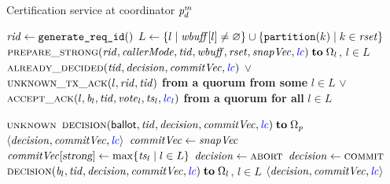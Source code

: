 
\begin{algorithm*}[t]
  \caption{Certification service at coordinator $\mathit{p}^{m}_{d}$}
  \label{alg:unistore-certify}
  \begin{algorithmic}[1]
    \Function{\certify}{$\callerMode, \tidvar, \wbuffvar, \rsetvar, \snapvc, \lccolor{\lcvar}$}
      \label{line:function-certify}
      \State \var $\mathit{rid} \gets \texttt{generate\_req\_id}()$
      \State \var $L \gets \{l \mid \mathit{wbuff}[l] \neq \varnothing\}
        \cup \{\mathtt{partition}(k) \mid k \in \mathit{rset}\}$
        \label{line:certify-L}
      \Repeat
        \State \send
          $\Call{\preparestrong}{\reqIdVar, \callerMode,
            \tidvar, \wbuffvar, \rsetvar, \snapvc, \lccolor{\lcvar}}
          \sendto \Omega_{l}$, $l \in L$
          \label{line:certify-call-preparestrong}
        \State \asyncwait \receive $\Call{\alreadydecided}{\tidvar, \decisionvar,
          \commitvc, \lccolor{\lcvar}}$
          \label{line:certify-wait-alreadydecided}
        \Statex \hspace{1.95cm} $\lor$ \receive $\Call{\unknowntxAck}{l, \reqIdVar, \tidvar}$
          \textbf{from a quorum from some} $l \in L$
        \Statex \hspace{1.95cm} $\lor$ \receive
          $\Call{\acceptack}{l, \ballotvar_{l}, \tidvar, \votevar_{l}, \tsvar_{l}, \lccolor{\lcvar_{l}}}$
            \textbf{from a quorum for all} $l \in L$
          \label{line:certify-wait-acceptack}
      \Until{\notkw\timeout}

      \hStatex
        \State \Return $\textsc{unknown}$
      \ElsIf{\received $\Call{\alreadydecided}{\tidvar, \decisionvar, \commitvc, \lccolor{\lcvar}}$}
        \label{line:certify-received-alreadydecided}
        \State \send $\Call{\decision}{\ballotVar, \tidvar, \decisionvar, \commitvc, \lccolor{\lcvar}}
          \sendto \Omega_{\pvar}$
        \State \Return $\langle \mathit{decision}, \mathit{commitVec}, \textcolor{blue}{\mathit{lc}} \rangle$
          \label{line:certify-return-alreadydecided}
      \Else
        \State $\mathit{commitVec} \gets \mathit{snapVec}$
          \label{line:certify-commitvc}
        \State $\mathit{commitVec}[\textsl{strong}] \gets \max \{\mathit{ts}_{l} \mid l \in L\}$
          \label{line:certify-commitvc-strongentry}
          {$\mathit{decision} \gets \textsc{abort}$ \label{line:certify-decision-abort}}
          {$\mathit{decision} \gets \textsc{commit}$ \label{line:certify-decision-commit}}
        \State {}
          \label{line:certify-lc}
        \State \send $\Call{\decision}{\ballotvar_{l}, \tidvar, \decisionvar, \commitvc, \lccolor{\lcvar}}
          \sendto \Omega_{l}$, $l \in L$
          \label{line:certify-call-desision}
        \State \Return $\langle \mathit{decision}, \mathit{commitVec}, \textcolor{blue}{\mathit{lc}} \rangle$
          \label{line:certify-return-acceptack}
      \EndIf
    \EndFunction
  \end{algorithmic}
\end{algorithm*}